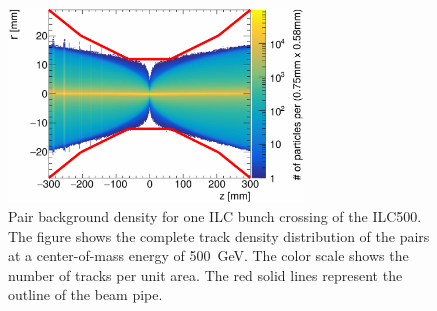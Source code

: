\begin{figure}
    \centering
    \includegraphics[width=0.7\textwidth]{Figures/Pairs/Helix_tracks_xz_ILC500.pdf}
    \caption[Pair background density distribution for the ILC500]{
    Pair background density for one ILC bunch crossing of the ILC500.
   The figure shows the complete track density distribution of the pairs at a center-of-mass energy of \SI[detect-all]{500}{\GeV}.
   The color scale shows the number of tracks per unit area.
   The red solid lines represent the outline of the beam pipe.
    }
    \label{fig:PairBkg:Density}
\end{figure}

